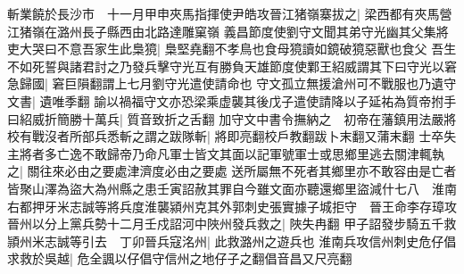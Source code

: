 斬業饒於長沙市　十一月甲申夾馬指揮使尹皓攻晉江猪嶺寨拔之|{
	梁西都有夾馬營江猪嶺在潞州長子縣西由北路達雕窠嶺}
義昌節度使劉守文聞其弟守光幽其父集將吏大哭曰不意吾家生此梟獍|{
	梟堅堯翻不孝鳥也食母獍讀如鏡破獍惡獸也食父}
吾生不如死誓與諸君討之乃發兵擊守光互有勝負天雄節度使鄴王紹威謂其下曰守光以窘急歸國|{
	窘巨隕翻謂上七月劉守光遣使請命也}
守文孤立無援滄州可不戰服也乃遺守文書|{
	遺唯季翻}
諭以禍福守文亦恐梁乘虚襲其後戊子遣使請降以子延祐為質帝拊手曰紹威折簡勝十萬兵|{
	質音致折之舌翻}
加守文中書令撫納之　初帝在藩鎮用法嚴將校有戰沒者所部兵悉斬之謂之跋隊斬|{
	將即亮翻校戶教翻跋卜末翻又蒲末翻}
士卒失主將者多亡逸不敢歸帝乃命凡軍士皆文其面以記軍號軍士或思鄉里逃去關津輒執之|{
	關往來必由之要處津濟度必由之要處}
送所屬無不死者其鄉里亦不敢容由是亡者皆聚山澤為盜大為州縣之患壬寅詔赦其罪自今雖文面亦聽還鄉里盜減什七八　淮南右都押牙米志誠等將兵度淮襲潁州克其外郭刺史張實據子城拒守　晉王命李存璋攻晉州以分上黨兵勢十二月壬戍詔河中陜州發兵救之|{
	陜失冉翻}
甲子詔發步騎五千救頴州米志誠等引去　丁卯晉兵寇洺州|{
	此救潞州之遊兵也}
淮南兵攻信州刺史危仔倡求救於吳越|{
	危全諷以仔倡守信州之地仔子之翻倡音昌又尺亮翻}


